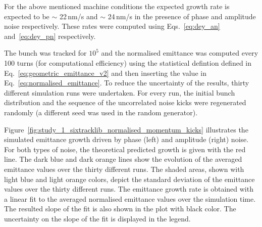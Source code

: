 For the above mentioned machine conditions the expected growth rate is expected to be $\sim$ 22\,nm/s and $\sim$ 24\,nm/s in the presence of phase and amplitude noise respectively. These rates were computed using Eqs.~\eqref{eq:dey_an} and~\ref{eq:dey_pn} respectively.


The bunch was tracked for $10^5$ and the normalised emittance was computed every 100 turns (for computational efficiency) using the statistical defintion defined in Eq.~\eqref{eq:geometric_emittance_v2} and then inserting the value in Eq.~\eqref{eq:normalised_emittance}. To reduce the uncertainty of the results, thirty different simulation runs were undertaken. For every run, the initial bunch distribution and the sequence of the uncorrelated noise kicks were regenerated randomly (a different seed was used in the random generator). 

Figure~\ref{fig:study_1_sixtracklib_normalised_momentum_kicks} illustrates the simulated emittance growth driven by phase (left) and amplitude (right) noise. For both types of noise, the theoretical predicted growth is given with the red line. The dark blue and dark orange lines show the evolution of the averaged emittance values over the thirty different runs. The shaded areas, shown with light blue and light orange colors, depict the standard deviation of the emittance values over the thirty different runs. The emittance growth rate is obtained with a linear fit to the averaged normalised emittance values over the simulation time. The resulted slope of the fit is also shown in the plot with black color. The uncertainty on the slope of the fit is displayed in the legend.

